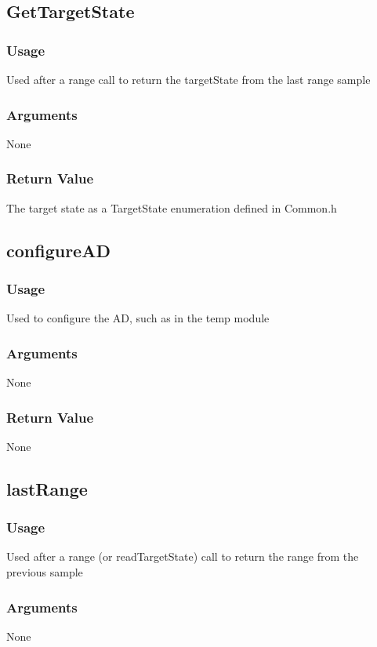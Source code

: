 \documentclass[]{report}
\begin{document}
\subsection{GetTargetState}
\subsubsection{Usage}
Used after a range call to return the targetState from the last range sample

\subsubsection{Arguments}
None

\subsubsection{Return Value}
The target state as a TargetState enumeration defined in Common.h

\subsection{configureAD}
\subsubsection{Usage}
Used to configure the AD, such as in the temp module

\subsubsection{Arguments}
None

\subsubsection{Return Value}
None

\subsection{lastRange}
\subsubsection{Usage}
Used after a range (or readTargetState) call to return the range from the previous sample

\subsubsection{Arguments}
None
\end{document}
